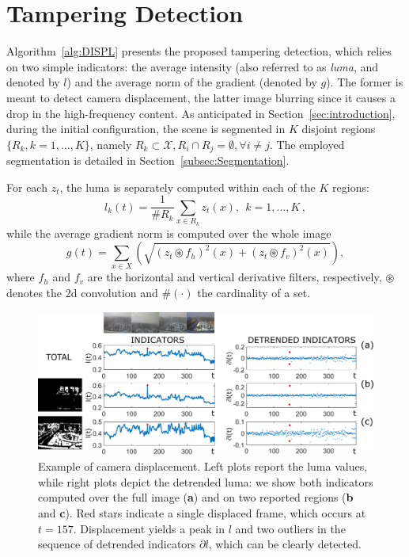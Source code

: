 \documentclass{llncs}
\begin{document}
\section{Tampering Detection}\label{sec:propSol}

Algorithm~\ref{alg:DISPL} presents the proposed tampering detection, which relies on two simple indicators: the average intensity (also referred to as \emph{luma}, and denoted by $l$) and the average norm of the gradient (denoted by $g$). The former is meant to detect camera displacement, the latter image blurring since it causes a drop in the high-frequency content. As anticipated in Section~\ref{sec:introduction}, during the initial configuration, the scene is segmented in $K$ disjoint regions $\{R_k, k = 1,\dots,K\}$, namely $R_k \subset \mathcal{X}, R_i \cap R_j = \emptyset, \forall i \neq j$. The employed segmentation is detailed in Section~\ref{subsec:Segmentation}. 

For each $z_t$, the luma is separately computed within each of the $K$ regions:
\begin{equation}\label{eq:lumaRegions}
l_k(t) =\frac{1}{\#R_k} \sum_{x \in R_k} z_t(x), \ \ k = 1, \dots, K\,,
\end{equation}
while the average gradient norm is computed over the whole image
\begin{equation}
\label{eq:normaGradiente}
g(t) = \sum_{x \in X} \left (\sqrt{\left(z_t \circledast f_h\right)^2(x) + \left(z_t \circledast f_v\right)^2(x)}\right),
\end{equation}
where $f_h$ and $f_v$ are the horizontal and vertical derivative filters, respectively, $\circledast$ denotes the 2d convolution and $\#(\cdot)$ the cardinality of a set.

\begin{figure}[tb]
\centering
\includegraphics[width=1\linewidth]{Immagini/indicatori}
\caption{Example of camera displacement. Left plots report the luma values, while right plots depict the detrended luma: we show both indicators computed over the full image (\textbf{a}) and on two reported regions (\textbf{b} and \textbf{c}). Red stars indicate a single displaced frame, which occurs at $t =157$. Displacement yields a peak in $l$ and two outliers in the sequence of detrended indicators $\partial l$, which can be clearly detected. }
\label{fig:indicatori} 
\end{figure}
\end{document}
